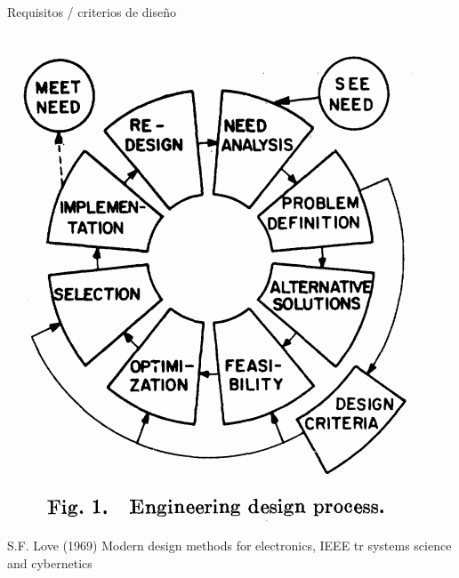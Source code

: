 \documentclass[presentation,aspectratio=169]{beamer}
\begin{document}
\begin{frame}[label={sec:orgd970100}]{Requisitos / criterios de diseño}
 \begin{center}
\includegraphics[height=0.6\textheight]{../../figures/design-process-fig1.png}\\
{\footnotesize  S.F. Love (1969) Modern design methods for electronics,  IEEE tr systems science and cybernetics}
\end{center}
\end{frame}
\end{document}
